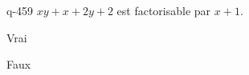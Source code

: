 \begin{truefalse}{q-459}
$xy+x+2y+2$ est factorisable par $x+1$.
\item Vrai
\item* Faux
\end{truefalse}

